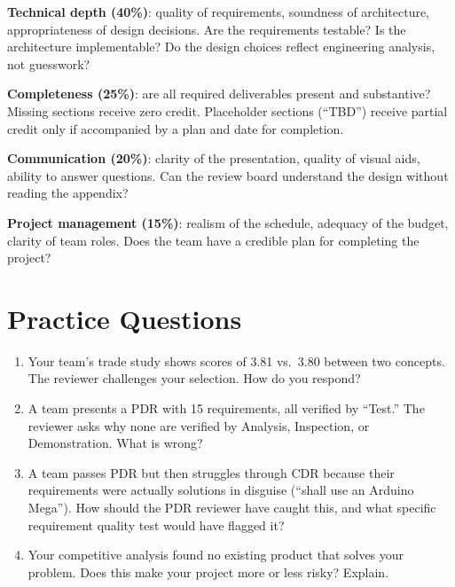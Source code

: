 \documentclass[11pt,letterpaper,twoside,openany]{book}
\begin{document}
\textbf{Technical depth (40\%)}: quality of requirements, soundness of architecture, appropriateness of design decisions. Are the requirements testable? Is the architecture implementable? Do the design choices reflect engineering analysis, not guesswork?

\textbf{Completeness (25\%)}: are all required deliverables present and substantive? Missing sections receive zero credit. Placeholder sections (``TBD'') receive partial credit only if accompanied by a plan and date for completion.

\textbf{Communication (20\%)}: clarity of the presentation, quality of visual aids, ability to answer questions. Can the review board understand the design without reading the appendix?

\textbf{Project management (15\%)}: realism of the schedule, adequacy of the budget, clarity of team roles. Does the team have a credible plan for completing the project?
\section{Practice Questions}
\begin{enumerate}[leftmargin=1.5em]
\item Your team's trade study shows scores of 3.81 vs.\ 3.80 between two concepts. The reviewer challenges your selection. How do you respond?
\item A team presents a PDR with 15 requirements, all verified by ``Test.'' The reviewer asks why none are verified by Analysis, Inspection, or Demonstration. What is wrong?

\item A team passes PDR but then struggles through CDR because their requirements were actually solutions in disguise (``shall use an Arduino Mega''). How should the PDR reviewer have caught this, and what specific requirement quality test would have flagged it?
\item Your competitive analysis found no existing product that solves your problem. Does this make your project more or less risky? Explain.
\end{enumerate}
\end{document}
